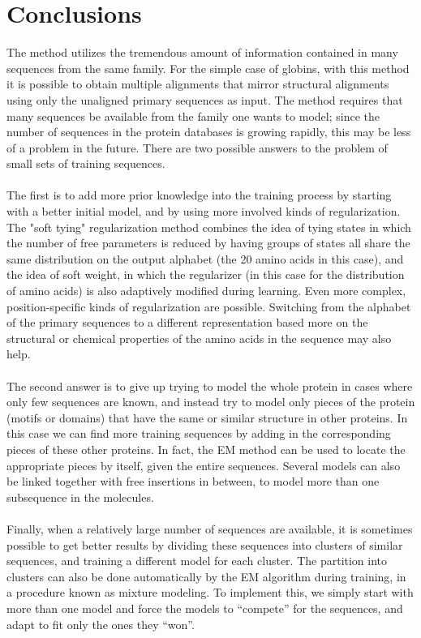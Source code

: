 \section{Conclusions}
The method utilizes the tremendous amount of information contained in many sequences from the same family.
For the simple case of globins, with this method it is possible to obtain multiple alignments that mirror structural alignments using only the unaligned primary sequences as input.
The method requires that many sequences be available from the family one wants to model; since the number of sequences in the protein databases is growing rapidly, this may be less of a problem in the future.
There are two possible answers to the problem of small sets of training sequences.
\\
\\
\noindent
The first is to add more prior knowledge into the training process by starting with a better initial model, and by using more involved kinds of regularization.
The "soft tying" regularization method combines the idea of tying states in which the number of free parameters is reduced by having groups of states all share the same distribution on the output alphabet (the 20 amino acids in this case), and the idea of soft weight, in which the regularizer (in this case for the distribution of amino acids) is also adaptively modified during learning.
Even more complex, position-specific kinds of regularization are possible.
Switching from the alphabet of the primary sequences to a different representation based more on the structural or chemical properties of the amino acids in the sequence may also help.
\\
\\
\noindent
The second answer is to give up trying to model the whole protein in cases where only few sequences are known, and instead try to model only pieces of the protein (motifs or domains) that have the same or similar structure in other proteins. In this case we can find more training sequences by adding in the corresponding pieces of these other proteins. In fact, the EM method can be used to locate the appropriate pieces by itself, given the entire sequences. Several models can also be linked together with free insertions in between, to model more than one subsequence in the molecules.
\\
\\
\noindent
Finally, when a relatively large number of sequences are available, it is sometimes possible to get better results by dividing these sequences into clusters of similar sequences, and training a different model for each cluster.
The partition into clusters can also be done automatically by the EM algorithm during training, in a procedure known as mixture modeling. To implement this, we simply start with more than one model and force the models to “compete” for the sequences, and adapt to fit only the ones they “won”.
